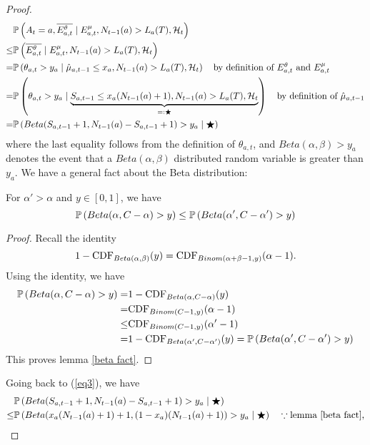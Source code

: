 \documentclass[11pt]{article}
\begin{document}
\begin{proof}
\begin{align}
    &\mathbb{P}\left( A_t = a, \overline{E^{\theta}_{a,t}}\mid E^{\mu}_{a,t}, N_{t-1}(a) > L_a(T), \mathcal{H}_t \right)\\
    \le& \mathbb{P}\left(  \overline{E^{\theta}_{a,t}}\mid E^{\mu}_{a,t}, N_{t-1}(a) > L_a(T), \mathcal{H}_t \right)\\
    =& \mathbb{P}\left(  \theta_{a,t} > y_a \mid \hat{\mu}_{a,t-1} \le x_a, N_{t-1}(a) > L_a(T), \mathcal{H}_t \right) \quad \mbox{by definition of $E^{\theta}_{a,t}$ and $E^\mu_{a,t}$} \\
    =& \mathbb{P}\left(  \theta_{a,t} > y_a \mid \underbrace{S_{a,t-1} \le x_a(N_{t-1}(a)+1), N_{t-1}(a) > L_a(T), \mathcal{H}_t}_{=:\bigstar} \right) \quad \mbox{by definition of $\hat{\mu}_{a,t-1}$} \\
    =& \mathbb{P}\left(  Beta(S_{a,t-1}+1,N_{t-1}(a)-S_{a,t-1}+1) > y_a \mid \bigstar \right) \label{eq3}
\end{align}
where the last equality follows from the definition of $\theta_{a,t}$, and $Beta(\alpha,\beta) > y_a$ denotes the event that a $Beta(\alpha,\beta)$ distributed random variable is greater than $y_a$. We have a general fact about the Beta distribution:
\begin{lemma}\label{beta fact}For $\alpha'>\alpha$ and $y\in [0,1]$, we have
$$\mathbb{P}\left( Beta(\alpha, C-\alpha)>y \right) \le \mathbb{P}\left( Beta(\alpha',C-\alpha')>y \right)$$ 
\end{lemma}
\begin{proof}
Recall the identity
\begin{equation}\label{CDF identity}
1- \mathrm{CDF}_{Beta(\alpha,\beta)}(y) = \mathrm{CDF}_{Binom(\alpha+\beta-1,y)}(\alpha-1).
\end{equation}
Using the identity, we have
\begin{align*}\mathbb{P}\left( Beta(\alpha, C-\alpha)>y \right) =& 1- \mathrm{CDF}_{Beta(\alpha,C-\alpha)}(y)\\
=& \mathrm{CDF}_{Binom(C-1,y)}(\alpha-1)\\
\le& \mathrm{CDF}_{Binom(C-1,y)}(\alpha'-1)\\
=& 1- \mathrm{CDF}_{Beta(\alpha',C-\alpha')}(y)=\mathbb{P}\left( Beta(\alpha', C-\alpha')>y \right)
\end{align*}
This proves lemma \ref{beta fact}.
\end{proof}
Going back to (\ref{eq3}), we have
\begin{align}&\prob{ Beta(S_{a,t-1}+1,N_{t-1}(a)-S_{a,t-1}+1) > y_a \mid \bigstar}\\
\le& \prob{ Beta(x_a(N_{t-1}(a)+1)+1,(1-x_a)(N_{t-1}(a)+1)) > y_a \mid \bigstar}\quad \because \mbox{lemma \ref{beta fact},}\\

\end{align}
\end{proof}
\end{document}

